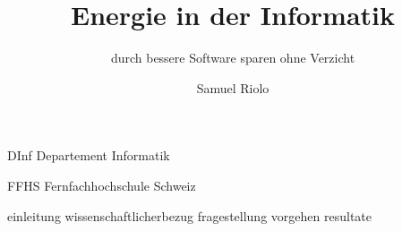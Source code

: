 \documentclass{../template/ffhsthesis}
\begin{document}

\title{Energie in der Informatik}
\subtitle{ durch bessere Software sparen ohne Verzicht} %
\author{Samuel Riolo}


\maketitle



\tableofcontents


\begin{abkuerzungen}[MUSTER] %
\item[DInf] Departement Informatik
\item[FFHS] Fernfachhochschule Schweiz
\end{abkuerzungen}


\startThesis %


\addtolength{\parskip}{\baselineskip}
\parindent 0pt 



{einleitung}
{wissenschaftlicherbezug}
{fragestellung}
{vorgehen}
{resultate}








\end{document}
